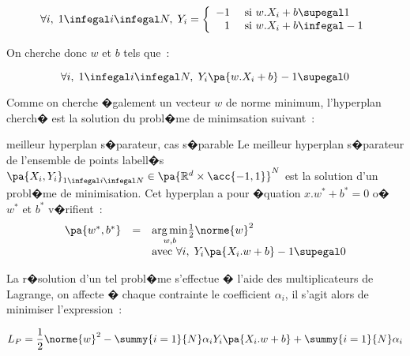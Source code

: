             $$
            \forall i, \; 1 \infegal i \infegal N, \; 
                        Y_i = \left\{ \begin{array}{rl}
                                                        -1 & \text{ si } w.X_i + b \supegal 1 \\ 
                                                         1 & \text{ si } w.X_i + b \infegal -1
                                                    \end{array} \right.
            $$

On cherche donc $w$ et $b$ tels que~:

            $$
            \forall i, \; 1 \infegal i \infegal N, \; 
                        Y_i \pa{ w.X_i + b} - 1 \supegal 0
            $$

Comme on cherche �galement un vecteur $w$ de norme minimum, l'hyperplan cherch� est la solution du probl�me de minimsation suivant~:


            \begin{xproblem}{meilleur hyperplan s�parateur, cas s�parable}\label{svm_problem_def}
            Le meilleur hyperplan s�parateur de l'ensemble de points labell�s
            $\pa{X_i,Y_i}_{1 \infegal i \infegal N} \in \pa{ \mathbb{R}^d \times \acc{-1,1} }^N$ est la solution
            d'un probl�me de minimisation. Cet hyperplan a pour �quation $x.w^* + b^* = 0$ o� 
            $w^*$ et $b^*$ v�rifient~:
                    $$
                    \begin{array}{rcl}    \pa{w^*,b^*} &=& \underset{w,b}{\arg \min} \frac{1}{2} \norme{w}^2 \\
                                         && \text{avec } \forall i, \; Y_i \pa{ X_i .w + b } -1 \supegal 0 
                    \end{array}                                        
                    $$
            \end{xproblem}


La r�solution d'un tel probl�me s'effectue � l'aide des multiplicateurs de Lagrange, on affecte � chaque contrainte le coefficient $\alpha_i$, il s'agit alors de minimiser l'expression~:

            \begin{eqnarray}
            L_P = \frac{1}{2} \norme{w}^2 - \summy{i=1}{N} \alpha_i Y_i \pa{ X_i . w + b } + \summy{i=1}{N} \alpha_i
            \label{svm_lagrange_lineaire}
            \end{eqnarray}

